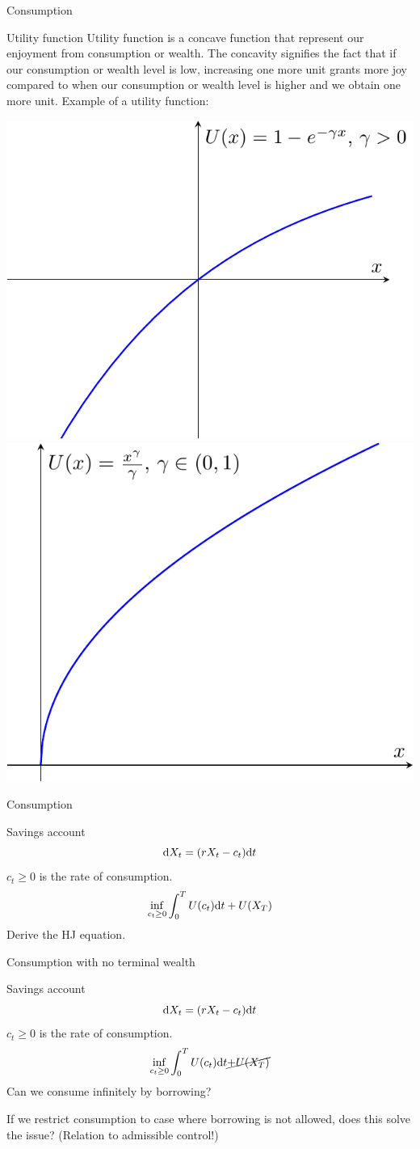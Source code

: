 \documentclass[color=usenames,dvipsnames]{beamer}
\newcommand{\dd}{\text{\normalfont d}}
\newcommand{\dt}{\text{\normalfont d}t}
\begin{document}
\begin{frame}{Consumption}
    \begin{block}
        {Utility function}
        Utility function is a concave function that represent our enjoyment from consumption or wealth. The concavity signifies the fact that if our consumption or wealth level is low, increasing one more unit grants more joy compared to when our consumption or wealth level is higher and we obtain one more unit.
        Example of a utility function:
        \begin{center}
            \includegraphics[width=0.35\linewidth]{Control_lecture_notes/Figs/utility1.pdf}
            \includegraphics[width=0.35\linewidth]{Control_lecture_notes/Figs/utility2.pdf}
        \end{center}
        
    \end{block}
\end{frame}


\begin{frame}{Consumption}
    \begin{block}
        {Savings account}
        \[
        \dd{X}_t = (rX_t - c_t)\dt
        \]
        $c_t\ge0$ is the rate of consumption.
        \[
        \inf_{c_t\ge0} \int_0^T U(c_t)\dt + U(X_T)
        \]
        Derive the HJ equation.
    \end{block}
\end{frame}



\begin{frame}{Consumption with no terminal wealth}
    \begin{block}
        {Savings account}
        \[
        \dd{X}_t = (rX_t - c_t)\dt
        \]
        $c_t\ge0$ is the rate of consumption.
        \[
        \inf_{c_t\ge0} \int_0^T U(c_t)\dt \cancel{+ U(X_T)}
        \]
        Can we consume infinitely by borrowing? 

        If we restrict consumption to case where borrowing is not allowed, does this solve the issue? (Relation to admissible control!)
    \end{block}
\end{frame}
\end{document}
